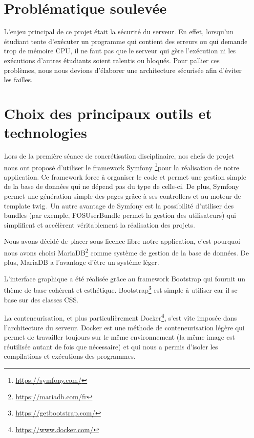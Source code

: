 \section{Problématique soulevée}

\par L'enjeu principal de ce projet était la sécurité du serveur. En effet, lorsqu'un étudiant tente d'exécuter un programme qui contient des erreurs ou qui demande trop de mémoire CPU, il ne faut pas que le serveur qui gère l'exécution ni les exécutions d'autres étudiants soient ralentis ou bloqués. Pour pallier ces problèmes, nous nous devions d'élaborer une architecture sécurisée afin d'éviter les failles.


\section{Choix des principaux outils et technologies}
\label{sec-principaux-outils}
\par Lors de la première séance de concrétisation disciplinaire, nos chefs de projet nous ont proposé d'utiliser le framework Symfony \footnote{\url{https://symfony.com/}}pour la réalisation de notre application. Ce framework force à organiser le code et permet une gestion simple de la base de données qui ne dépend pas du type de celle-ci. De plus, Symfony permet une génération simple des pages grâce à ses controllers et au moteur de template twig.\
Un autre avantage de Symfony est la possibilité d'utiliser des bundles (par exemple, FOSUserBundle permet la gestion des utilisateurs) qui simplifient et accélèrent véritablement la réalisation des projets. \\

\par Nous avons décidé de placer sous licence libre notre application, c'est pourquoi nous avons choisi MariaDB\footnote{\url{https://mariadb.com/fr}} comme système de gestion de la base de données. De plus, MariaDB a l'avantage d'être un système léger. \\

\par L'interface graphique a été réalisée grâce au framework Bootstrap qui fournit un thème de base cohérent et esthétique. Bootstrap\footnote{\url{https://getbootstrap.com/}} est simple à utiliser car il se base sur des classes CSS. \\

\par La conteneurisation, et plus particulièrement Docker\footnote{\url{https://www.docker.com/}}, s'est vite imposée dans l'architecture du serveur. Docker est une méthode de conteneurisation légère qui permet de travailler toujours sur le même environnement (la même image est réutilisée autant de fois que nécessaire) et qui nous a permis d'isoler les compilations et exécutions des programmes.

